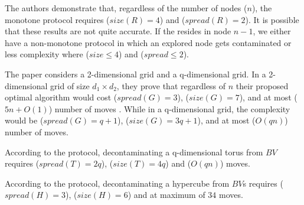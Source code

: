  The authors demonstrate that, regardless of the number of nodes ($n$), the monotone protocol requires ($size(R)= 4$) and ($spread(R)= 2$). It is possible that these results are not quite accurate. If the  \bv resides in node $n-1$, we either have a non-monotone protocol in which an explored node gets contaminated or  less complexity where ($size\leq 4$) and ($spread \leq 2$).

The paper considers a 2-dimensional grid and a q-dimensional grid. In a 2-dimensional grid of size $d_1\times d_2$, they prove that regardless of $n$ their proposed optimal algorithm would cost ($spread(G)=3$), ($size(G)=7$), and at most ($5n+O(1)$) number of moves . While in a q-dimensional grid, the complexity would be ($spread(G)=q+1$), ($size(G)=3q+1$), and at most ($O(qn)$)  number of moves. 

 According to the protocol, decontaminating a q-dimensional torus from $BV$  requires  ($spread(T)=2q$), ($size(T)=4q$) and  ($O(qn)$) moves.

 According to the protocol, decontaminating a hypercube from $BV$s requires ($spread(H)=3$), ($size(H)=6$) and at maximum of $34$ moves.
 

 









